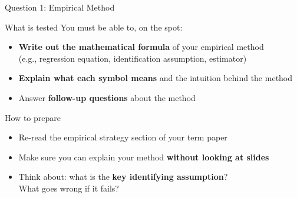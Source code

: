 \documentclass[dvipsnames,hyperref={pdfpagelabels=false}]{beamer}
\begin{document}
\begin{frame}{Question 1: Empirical Method}

\begin{block}{What is tested}
	You must be able to, on the spot:
	\begin{itemize}
		\vspace{0.1cm}
		\item \textbf{Write out the mathematical formula} of your empirical method\\
		      (e.g., regression equation, identification assumption, estimator)
		\vspace{0.1cm}
		\item \textbf{Explain what each symbol means} and the intuition behind the method
		\vspace{0.1cm}
		\item Answer \textbf{follow-up questions} about the method
	\end{itemize}
\end{block}

\vspace{0.3cm}

\begin{exampleblock}{How to prepare}
	\begin{itemize}
		\item Re-read the empirical strategy section of your term paper
		\vspace{0.1cm}
		\item Make sure you can explain your method \textbf{without looking at slides}
		\vspace{0.1cm}
		\item Think about: what is the \textbf{key identifying assumption}?\\
		      What goes wrong if it fails?
	\end{itemize}
\end{exampleblock}

\end{frame}
\end{document}
